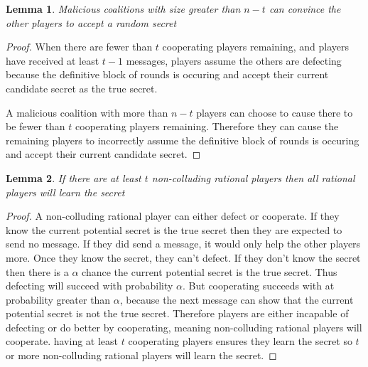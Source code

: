 \documentclass{dalcsthesis}
\newtheorem{lemma}{Lemma}
\begin{document}
\begin{lemma} Malicious coalitions with size greater than $n-t$ can convince the other players to accept a random secret \end{lemma}
\begin{proof}
When there are fewer than $t$ cooperating players remaining, and players have received at least $t-1$ messages, players assume the others are defecting because the definitive block of rounds is occuring and accept their current candidate secret as the true secret.

A malicious coalition with more than $n-t$ players can choose to cause there to be fewer than $t$ cooperating players remaining. Therefore they can cause the remaining players to incorrectly assume the definitive block of rounds is occuring and accept their current candidate secret.
\end{proof}

\begin{lemma} If there are at least $t$ non-colluding rational players then all rational players will learn the secret \end{lemma}
\begin{proof}
A non-colluding rational player can either defect or cooperate. If they know the current potential secret is the true secret then they are expected to send no message. If they did send a message, it would only help the other players more. Once they know the secret, they can't defect. If they don't know the secret then there is a $\alpha$ chance the current potential secret is the true secret. Thus defecting will succeed with probability $\alpha$. But cooperating succeeds with at probability greater than $\alpha$, because the next message can show that the current potential secret is not the true secret. Therefore players are either incapable of defecting or do better by cooperating, meaning non-colluding rational players will cooperate. having at least $t$ cooperating players ensures they learn the secret so $t$ or more non-colluding rational players will learn the secret.
\end{proof}
\end{document}
